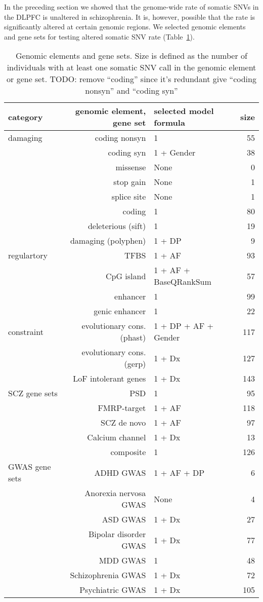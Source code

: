 \documentclass[letterpaper]{article}
\begin{document}
In the preceding section we showed that the genome-wide rate of somatic SNVs
in the DLPFC is unaltered in schizophrenia.  It is, however, possible 
that the rate is significantly altered at certain genomic regions.
We selected genomic elements and gene sets for testing altered somatic SNV
rate (Table~\ref{tab:modsel}).

\begin{table}
\begin{tabular}{lrlr}
category & genomic element, gene set & selected model formula & size \\
\hline
\hline
damaging & coding nonsyn & 1 & 55 \\
& coding syn & 1 + Gender & 38 \\
& missense & None & 0 \\
& stop gain & None & 1 \\
& splice site & None & 1 \\
& coding & 1 & 80 \\
& deleterious (sift) & 1 & 19 \\
& damaging (polyphen) & 1 + DP & 9 \\
\hline
regulartory & TFBS & 1 + AF & 93 \\
& CpG island & 1 + AF + BaseQRankSum & 57 \\
& enhancer & 1 & 99 \\
& genic enhancer & 1 & 22 \\
\hline
constraint & evolutionary cons. (phast) & 1 + DP + AF + Gender & 117 \\
& evolutionary cons. (gerp) & 1 + Dx & 127 \\
& LoF intolerant genes & 1 + Dx & 143 \\
\hline
SCZ gene sets & PSD & 1 & 95 \\
& FMRP-target & 1 + AF & 118 \\
& SCZ de novo & 1 + AF & 97 \\
& Calcium channel & 1 + Dx & 13 \\
& composite & 1 & 126 \\
\hline
GWAS gene sets & ADHD GWAS & 1 + AF + DP & 6 \\
& Anorexia nervosa GWAS & None & 4 \\
& ASD GWAS & 1 + Dx & 27 \\
& Bipolar disorder GWAS & 1 + Dx & 77 \\
& MDD GWAS & 1 & 48 \\
& Schizophrenia GWAS & 1 + Dx & 72 \\
& Psychiatric GWAS & 1 + Dx & 105 \\
\end{tabular}
\caption{
Genomic elements and gene sets.  Size is defined as the number of
individuals with at least one somatic SNV call in the genomic element
or gene set. TODO: remove ``coding'' since it's redundant give ``coding
nonsyn'' and ``coding syn''
}
\label{tab:modsel}
\end{table}
\end{document}
